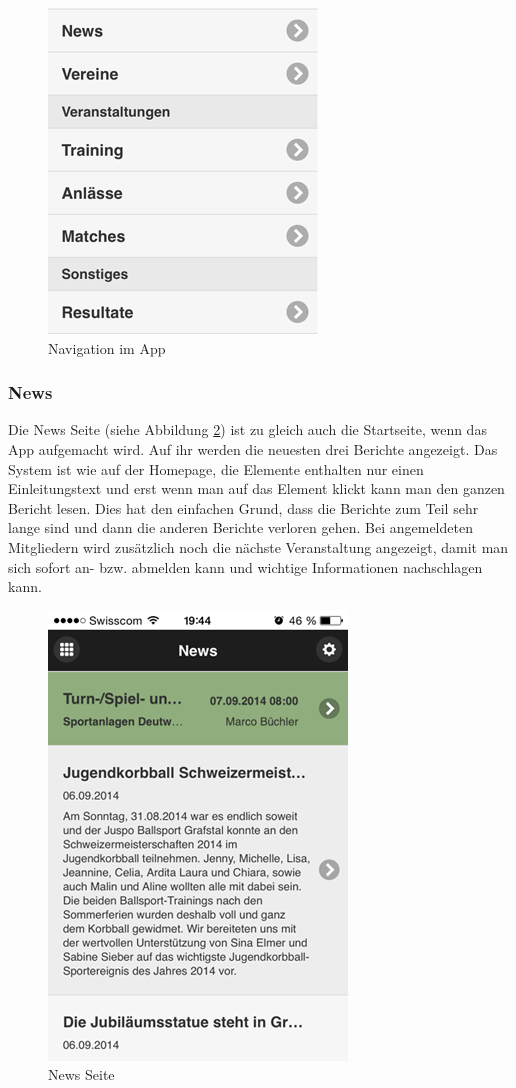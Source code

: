 \begin{figure}[h]
\centering
\includegraphics{images/app/navigation.png}
\caption{Navigation im App}
\label{fig:navigation}
\end{figure}

\FloatBarrier
\subsubsection{News}
Die News Seite (siehe Abbildung \ref{fig:app_news}) ist zu gleich auch die Startseite, wenn das App aufgemacht wird. Auf ihr werden die neuesten drei Berichte angezeigt. Das System ist wie auf der Homepage, die Elemente enthalten nur einen Einleitungstext und erst wenn man auf das Element klickt kann man den ganzen Bericht lesen. Dies hat den einfachen Grund, dass die Berichte zum Teil sehr lange sind und dann die anderen Berichte verloren gehen. Bei angemeldeten Mitgliedern wird zusätzlich noch die nächste Veranstaltung angezeigt, damit man sich sofort an- bzw. abmelden kann und wichtige Informationen nachschlagen kann.

\begin{figure}[h]
\centering
\includegraphics[scale=0.5]{images/app/news.png}
\caption{News Seite}
\label{fig:app_news}
\end{figure}

